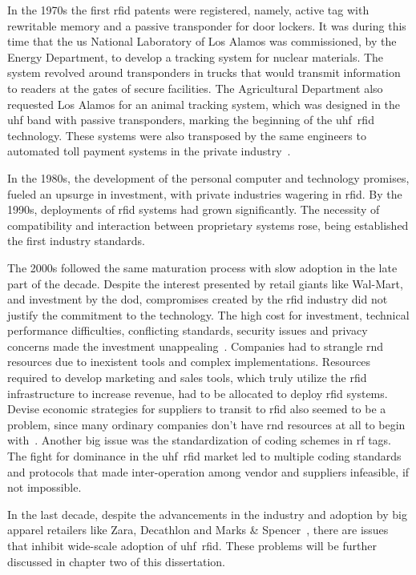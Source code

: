 In the 1970s the first \ac{rfid} patents were registered, namely, active tag with rewritable memory and a passive transponder for door lockers. It was during this time that the \ac{us} National Laboratory of Los Alamos was commissioned, by the Energy Department, to develop a tracking system for nuclear materials. The system revolved around transponders in trucks that would transmit information to readers at the gates of secure facilities. The Agricultural Department also requested Los Alamos for an animal tracking system, which was designed in the \ac{uhf} band with passive transponders, marking the beginning of the \acs{uhf}~\acs{rfid} technology. These systems were also transposed by the same engineers to automated toll payment systems in the private industry~\cite{landtHistoryRFID2005, HistoryRFIDTechnology,casierAnalogCircuitDesign2011}.

In the 1980s, the development of the personal computer and technology promises, fueled an upsurge in investment, with private industries wagering in \ac{rfid}.
By the 1990s, deployments of \ac{rfid} systems had grown significantly. The necessity of compatibility and interaction between proprietary systems rose, being established the first industry standards. 

The 2000s followed the same maturation process with slow adoption in the late part of the decade. 
Despite the interest presented by retail giants like Wal-Mart, and investment by the \ac{dod}, compromises created by the \ac{rfid} industry did not justify the commitment to the technology. The high cost for investment, technical performance difficulties, conflicting standards, security issues and privacy concerns made the investment unappealing~\cite{RFIDAdoptionStalls}. 
Companies had to strangle \ac{rnd} resources due to inexistent tools and complex implementations. Resources required to develop marketing and sales tools, which truly utilize the \ac{rfid} infrastructure to increase revenue, had to be allocated to deploy \ac{rfid} systems.
Devise economic strategies for suppliers to transit to \ac{rfid} also seemed to be a problem, since many ordinary companies don't have \ac{rnd} resources at all to begin with~\cite{gaudinSuppliersGainFailed2008}.
Another big issue was the standardization of coding schemes in \ac{rf} tags. The fight for dominance in the \acs{uhf}~\acs{rfid} market led to multiple coding standards and protocols that made inter-operation among vendor and suppliers infeasible, if not impossible.

In the last decade, despite the advancements in the industry and adoption by big apparel retailers like Zara, Decathlon and Marks \& Spencer~\cite{RFIDRetailApparel}, there are issues that inhibit wide-scale adoption of \acs{uhf}~\acs{rfid}. These problems will be further discussed in chapter two of this dissertation.

